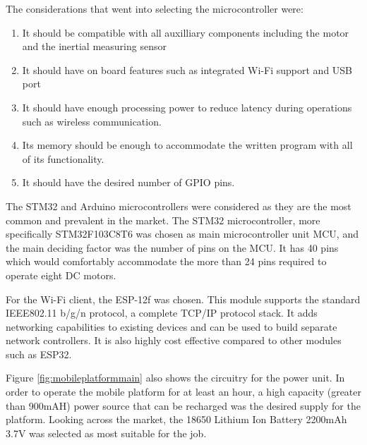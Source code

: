 The considerations that went into selecting the microcontroller were:
\begin{enumerate}[i]
    \item It should be compatible with all auxilliary components including the motor and the inertial measuring sensor
    \item It should have on board features such as integrated Wi-Fi support and USB port
    \item It should have enough processing power to reduce latency during operations such as wireless communication.
    \item Its memory should be enough to accommodate the written program with all of its functionality.
    \item It should have the desired number of GPIO pins.
\end{enumerate} 

\par
The STM32 and Arduino microcontrollers were considered as they are the most common and prevalent in the market. The STM32 microcontroller, more specifically STM32F103C8T6 was chosen as main microcontroller unit \ac{MCU}, and the main deciding factor was the number of pins on the \ac{MCU}. It has 40 pins which would comfortably accommodate the more than 24 pins required to operate eight \ac{DC} motors.
\par
For the Wi-Fi client, the ESP-12f was chosen. This module supports the standard IEEE802.11 b/g/n protocol, a complete
TCP/IP protocol stack. It adds networking capabilities to existing devices and can be used to build separate network controllers. It is also highly cost effective compared to other modules such as ESP32.

\par
Figure \ref{fig:mobileplatformmain} also shows the circuitry for the power unit. In order to operate the mobile platform for at least an hour, a high capacity (greater than 900mAH) power source that can be recharged was the desired supply for the platform. Looking across the market, the 18650 Lithium Ion Battery 2200mAh 3.7V was selected as most suitable for the job.

